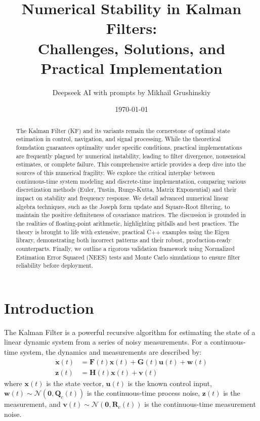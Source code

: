 \documentclass[11pt]{article}
\title{Numerical Stability in Kalman Filters:\\
Challenges, Solutions, and Practical Implementation}
\author{Deepseek AI with prompts by Mikhail Grushinskiy}
\date{\today}
\begin{document}
\maketitle

\begin{abstract}
The Kalman Filter (KF) and its variants remain the cornerstone of optimal state estimation in control, navigation, and signal processing. While the theoretical foundation guarantees optimality under specific conditions, practical implementations are frequently plagued by numerical instability, leading to filter divergence, nonsensical estimates, or complete failure. This comprehensive article provides a deep dive into the sources of this numerical fragility. We explore the critical interplay between continuous-time system modeling and discrete-time implementation, comparing various discretization methods (Euler, Tustin, Runge-Kutta, Matrix Exponential) and their impact on stability and frequency response. We detail advanced numerical linear algebra techniques, such as the Joseph form update and Square-Root filtering, to maintain the positive definiteness of covariance matrices. The discussion is grounded in the realities of floating-point arithmetic, highlighting pitfalls and best practices. The theory is brought to life with extensive, practical C++ examples using the Eigen library, demonstrating both incorrect patterns and their robust, production-ready counterparts. Finally, we outline a rigorous validation framework using Normalized Estimation Error Squared (NEES) tests and Monte Carlo simulations to ensure filter reliability before deployment.
\end{abstract}

\tableofcontents
\newpage

\section{Introduction}
\label{sec:intro}
The Kalman Filter is a powerful recursive algorithm for estimating the state of a linear dynamic system from a series of noisy measurements. For a continuous-time system, the dynamics and measurements are described by:
\begin{align}
\dot{\bm{x}}(t) &= \bm{F}(t) \bm{x}(t) + \bm{G}(t) \bm{u}(t) + \bm{w}(t) \label{eq:cont_sys}\\
\bm{z}(t) &= \bm{H}(t) \bm{x}(t) + \bm{v}(t) \label{eq:cont_meas}
\end{align}
where $\bm{x}(t)$ is the state vector, $\bm{u}(t)$ is the known control input, $\bm{w}(t) \sim \mathcal{N}(\bm{0}, \bm{Q}_c(t))$ is the continuous-time process noise, $\bm{z}(t)$ is the measurement, and $\bm{v}(t) \sim \mathcal{N}(\bm{0}, \bm{R}_c(t))$ is the continuous-time measurement noise.
\end{document}
